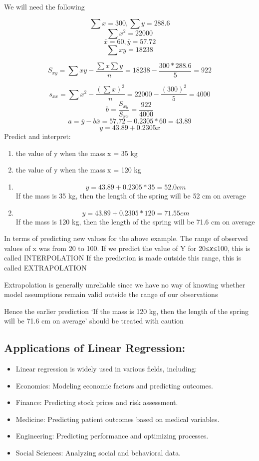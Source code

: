 \documentclass[
  letterpaper,
  DIV=11,
  numbers=noendperiod]{scrartcl}
\providecommand{\tightlist}{%
  \setlength{\itemsep}{0pt}\setlength{\parskip}{0pt}}\usepackage{longtable,booktabs,array}
\begin{document}
We will need the following

\[ \sum x = 300, \sum y = 288.6 \] \[ \sum x^2 = 22000 \]
\[ \bar x = 60, \bar y = 57.72 \] \[ \sum xy = 18238 \]

\[ S_{xy}  = \sum xy - \frac{\sum x \sum y}{n} = 18238 - \frac{300 * 288.6}{5} = 922 \]

\[ s_{xx} = \sum x^2 - \frac{(\sum x)^2}{n} = 22000 - \frac{(300)^2}{5} = 4000 \]
\[ b = \frac{S_{xy}}{S_{xx}} = \frac{922}{4000}\]
\[ a = \bar y - b\bar x = 57.72 - 0.2305 * 60 = 43.89\]
\[ y = 43.89 + 0.2305x \] Predict and interpret:

\begin{enumerate}
\def\labelenumi{\alph{enumi}.}
\tightlist
\item
  the value of y when the mass x = 35 kg
\item
  the value of y when the mass x = 120 kg
\end{enumerate}

\begin{enumerate}
\def\labelenumi{\alph{enumi})}
\item
  \[y=43.89+0.2305*35=52.0 cm \] If the mass is 35 kg, then the length
  of the spring will be 52 cm on average
\item
  \[y=43.89+0.2305*120=71.55 cm \] If the mass is 120 kg, then the
  length of the spring will be 71.6 cm on average
\end{enumerate}

In terms of predicting new values for the above example. The range of
observed values of x was from 20 to 100. If we predict the value of Y
for 20≤𝑥≤100, this is called INTERPOLATION If the prediction is made
outside this range, this is called EXTRAPOLATION

Extrapolation is generally unreliable since we have no way of knowing
whether model assumptions remain valid outside the range of our
observations

Hence the earlier prediction `If the mass is 120 kg, then the length of
the spring will be 71.6 cm on average' should be treated with caution

\subsection{Applications of Linear
Regression:}\label{applications-of-linear-regression}

\begin{itemize}
\tightlist
\item
  Linear regression is widely used in various fields, including:
\item
  Economics: Modeling economic factors and predicting outcomes.
\item
  Finance: Predicting stock prices and risk assessment.
\item
  Medicine: Predicting patient outcomes based on medical variables.
\item
  Engineering: Predicting performance and optimizing processes.
\item
  Social Sciences: Analyzing social and behavioral data.
\end{itemize}
\end{document}
